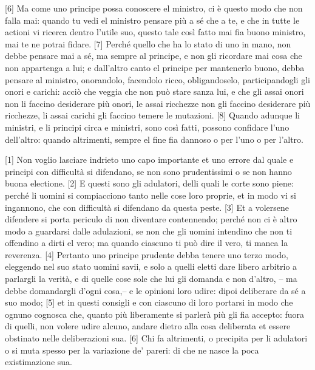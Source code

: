 \quebra

{[}6{]} Ma come uno principe possa conoscere el ministro, ci è questo
modo che non falla mai: quando tu vedi el ministro pensare più a sé che
a te, e che in tutte le actioni vi ricerca dentro l'utile suo, questo
tale così fatto mai fia buono ministro, mai te ne potrai fidare. {[}7{]}
Perché quello che ha lo stato di uno in mano, non debbe pensare mai a
sé, ma sempre al principe, e non gli ricordare mai cosa che non
appartenga a lui; e dall'altro canto el principe per mantenerlo buono,
debba pensare al ministro, onorandolo, facendolo ricco, obligandoselo,
participandogli gli onori e carichi: acciò che veggia che non può stare
sanza lui, e che gli assai onori non li faccino desiderare più onori, le
assai ricchezze non gli faccino desiderare più ricchezze, li assai
carichi gli faccino temere le mutazioni. {[}8{]} Quando adunque li
ministri, e li principi circa e ministri, sono così fatti, possono
confidare l'uno dell'altro: quando altrimenti, sempre el fine fia
dannoso o per l'uno o per l'altro.


{[}1{]} Non voglio lasciare indrieto uno capo importante et uno errore
dal quale e principi con difficultà si difendano, se non sono
prudentissimi o se non hanno buona electione. {[}2{]} E questi sono gli
adulatori, delli quali le corte sono piene: perché li uomini si
compiacciono tanto nelle cose loro proprie, et in modo vi si ingannono,
che con difficultà si difendano da questa peste. {[}3{]} Et a volersene
difendere si porta periculo di non diventare contennendo; perché non ci
è altro modo a guardarsi dalle adulazioni, se non che gli uomini
intendino che non ti offendino a dirti el vero; ma quando ciascuno ti
può dire il vero, ti manca la reverenza. {[}4{]} Pertanto uno principe
prudente debba tenere uno terzo modo, eleggendo nel suo stato uomini
savii, e solo a quelli eletti dare libero arbitrio a parlargli la
verità, e di quelle cose sole che lui gli domanda e non d'altro, -- ma
debbe domandargli d'ogni cosa,-- e le opinioni loro udire: dipoi
deliberare da sé a suo modo; {[}5{]} et in questi consigli e con
ciascuno di loro portarsi in modo che ognuno cognosca che, quanto più
liberamente si parlerà più gli fia accepto: fuora di quelli, non volere
udire alcuno, andare dietro alla cosa deliberata et essere obstinato
nelle deliberazioni sua. {[}6{]} Chi fa altrimenti, o precipita per li
adulatori o si muta spesso per la variazione de' pareri: di che ne nasce
la poca existimazione sua.

